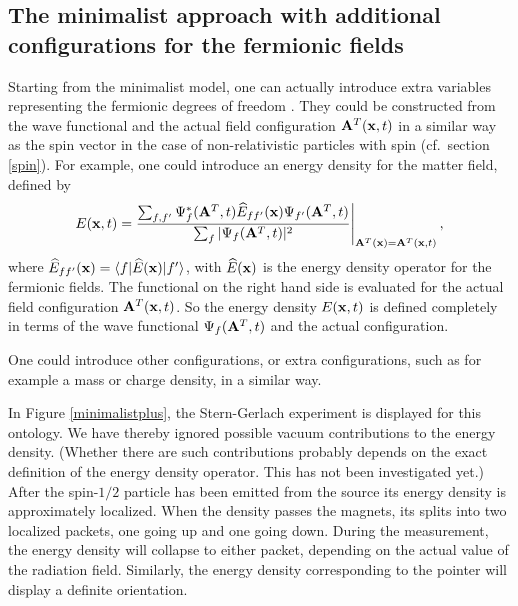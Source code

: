 \documentclass[11pt]{article}
\begin{document}
\subsection{The minimalist approach with additional configurations for the fermionic fields}
Starting from the minimalist model, one can actually introduce extra variables representing the fermionic degrees of freedom \cite{struyve07b}. They could be constructed from the wave functional and the actual field configuration ${\bf A}^T ({\bf x},t)$ in a similar way as the spin vector in the case of non-relativistic particles with spin (cf.\ section \ref{spin}). For example, one could introduce an energy density for the matter field, defined by 
\begin{equation}
E({\bf x},t) =  \frac{\sum_{f,f'} \Psi^*_f({\bf A}^T,t) {\widehat E}_{ff'} ({\bf x}) \Psi_{f'}({\bf A}^T,t)  }{\sum_f |\Psi_f({\bf A}^T,t)|^2}\Bigg|_{{\bf A}^T({\bf x}) = {\bf A}^T ({\bf x},t)} \,,
\label{8}
\end{equation}
where ${\widehat E}_{ff'}({\bf x}) = \langle f | {\widehat E}({\bf x}) |f'\rangle$, with ${\widehat E}({\bf x})$ is the energy density operator for the fermionic fields. The functional on the right hand side is evaluated for the actual field configuration ${\bf A}^T ({\bf x},t)$. So the energy density $E({\bf x},t)$ is defined completely in terms of the wave functional $\Psi_f({\bf A}^T,t)$ and the actual configuration. 

One could introduce other configurations, or extra configurations, such as for example a mass or charge density, in a similar way.
 
In Figure \ref{minimalistplus}, the Stern-Gerlach experiment is displayed for this ontology. We have thereby ignored possible vacuum contributions to the energy density. (Whether there are such contributions probably depends on the exact definition of the energy density operator. This has not been investigated yet.) After the spin-$1/2$ particle has been emitted from the source its energy density is approximately localized. When the density passes the magnets, its splits into two localized packets, one going up and one going down. During the measurement, the energy density will collapse to either packet, depending on the actual value of the radiation field. Similarly, the energy density corresponding to the pointer will display a definite orientation.
\end{document}
